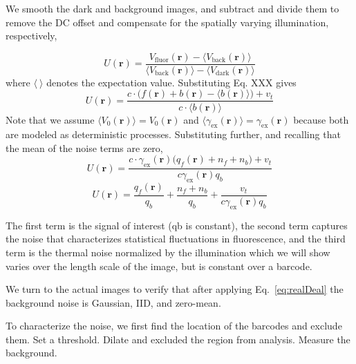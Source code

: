 We smooth the dark and background images, and subtract and divide them to remove the DC offset and compensate for the spatially varying illumination, respectively,

\begin{equation}
U(\mathbf{r})= \frac{ V_{\text{fluor}}(\mathbf{r}) - \langle V_{\text{back}}(\mathbf{r}) \rangle }{ \langle V_{\text{back}}(\mathbf{r}) \rangle - \langle V_{\text{dark}}(\mathbf{r}) \rangle}
\end{equation}
where $\langle~\rangle$ denotes the expectation value. 
Substituting Eq. XXX gives
\begin{equation}
U(\mathbf{r})= \frac{ c \cdot \big( f(\mathbf{r})  +b(\mathbf{r}) -\langle b(\mathbf{r}) \rangle \big)+ v_t  }{   c \cdot \langle b(\mathbf{r}) \rangle }
\end{equation}
Note that we assume $\langle V_0(\mathbf{r}) \rangle = V_0(\mathbf{r})$ and $\langle \gamma_{\text{ex}}(\mathbf{r}) \rangle  = \gamma_{\text{ex}}(\mathbf{r})$ because both are modeled as deterministic processes. Substituting further, and recalling that the mean of the noise terms are zero,
\begin{equation}
U(\mathbf{r})= \frac{ c \cdot \gamma_{\text{ex}}(\mathbf{r}) \big(  q_f(\mathbf{r}) + n_f       +   n_b   \big) + v_t  }{     c \gamma_{\text{ex}}(\mathbf{r})  q_b }
\end{equation}
\begin{equation}\label{eq:realDeal}
U(\mathbf{r})= \frac{ q_f(\mathbf{r}) }{ q_b} + \frac{n_f   +   n_b } {q_b}  + \frac{ v_t }{   c \gamma_{\text{ex}}(\mathbf{r}) q_b} 
\end{equation}


The first term is the signal of interest  (qb is constant), the second term  captures the noise that characterizes statistical fluctuations in fluorescence, and the third term is the thermal noise normalized by the illumination which we will show varies over the length scale of the image, but is constant over a barcode.


We turn to the actual images to verify that after applying Eq.~\ref{eq:realDeal} the background noise is Gaussian, IID, and zero-mean.

To characterize the noise, we first find the location of the barcodes and exclude them. 
Set a threshold. Dilate and excluded the region from analysis. Measure the background.




